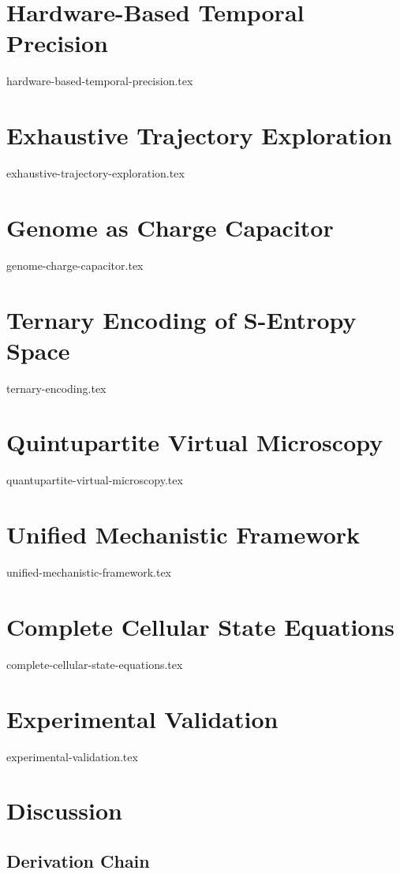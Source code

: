 \documentclass[11pt,a4paper]{article}
\theoremstyle{remark}
\begin{document}
\section{Hardware-Based Temporal Precision}
{hardware-based-temporal-precision.tex}

\section{Exhaustive Trajectory Exploration}
{exhaustive-trajectory-exploration.tex}

\section{Genome as Charge Capacitor}
{genome-charge-capacitor.tex}

\section{Ternary Encoding of S-Entropy Space}
{ternary-encoding.tex}

\section{Quintupartite Virtual Microscopy}
{quantupartite-virtual-microscopy.tex}

\section{Unified Mechanistic Framework}
{unified-mechanistic-framework.tex}

\section{Complete Cellular State Equations}
{complete-cellular-state-equations.tex}

\section{Experimental Validation}
{experimental-validation.tex}

\section{Discussion}

\subsection{Derivation Chain}
\end{document}
